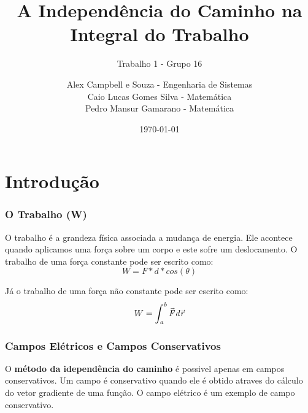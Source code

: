 \documentclass{beamer}
\title{A Independência do Caminho na Integral do Trabalho}
\subtitle{Trabalho 1 - Grupo 16}
\author [Alex, Caio, Pedro]{
    \small Alex Campbell e Souza - Engenharia de Sistemas \\ 
    Caio Lucas Gomes Silva - Matemática \\ 
    Pedro Mansur Gamarano - Matemática
}
\institute[]{
    \large UFMG \\
    \footnotesize Universidade Federal de Minas Gerais \\
    \small Fundamentos de Eletromagnetismo
}
\date{\today}
\def\vec{\mathaccent "017E\relax }
\begin{document}
\frame{\titlepage}

\frame{\tableofcontents}

\section{Introdução}
\begin{frame}
    \frametitle{O Trabalho (W)}
    
    O trabalho é a grandeza física associada a mudança de energia. 
    Ele acontece quando aplicamos uma força sobre um corpo e este sofre um deslocamento. 
    O trabalho de uma força constante pode ser escrito como: 
    \begin{equation}\label{eq:trabalho-constante}
    W = F * d * cos(\theta)
    \end{equation}

    Já o trabalho de uma força não constante pode ser escrito como: 
    \begin{equation}\label{trabalho-nao-constante}
    W = \mathit{\int_{a}^b \vec{F} d\vec{r}}
    \end{equation}

\end{frame}

\begin{frame}
    \frametitle{Campos Elétricos e Campos Conservativos}
    
    O \textbf{método da idependência do caminho} é possivel apenas em campos conservativos. 
    Um campo é conservativo quando ele é obtido atraves do cálculo do vetor gradiente de uma função. 
    O campo elétrico é um exemplo de campo conservativo.

\end{frame}
\end{document}
